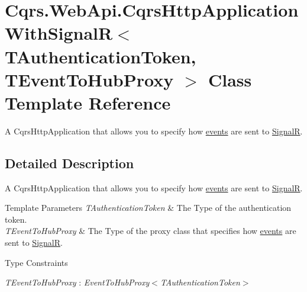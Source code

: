 \hypertarget{classCqrs_1_1WebApi_1_1CqrsHttpApplicationWithSignalR}{}\section{Cqrs.\+Web\+Api.\+Cqrs\+Http\+Application\+With\+SignalR$<$ T\+Authentication\+Token, T\+Event\+To\+Hub\+Proxy $>$ Class Template Reference}
\label{classCqrs_1_1WebApi_1_1CqrsHttpApplicationWithSignalR}


A Cqrs\+Http\+Application that allows you to specify how \hyperlink{}{events} are sent to \hyperlink{namespaceCqrs_1_1WebApi_1_1SignalR}{SignalR}.  




\subsection{Detailed Description}
A Cqrs\+Http\+Application that allows you to specify how \hyperlink{}{events} are sent to \hyperlink{namespaceCqrs_1_1WebApi_1_1SignalR}{SignalR}. 


\begin{DoxyTemplParams}{Template Parameters}
{\em T\+Authentication\+Token} & The Type of the authentication token.\\
\hline
{\em T\+Event\+To\+Hub\+Proxy} & The Type of the proxy class that specifies how \hyperlink{}{events} are sent to \hyperlink{namespaceCqrs_1_1WebApi_1_1SignalR}{SignalR}.\\
\hline
\end{DoxyTemplParams}
\begin{Desc}
\item[Type Constraints]\begin{description}
\item[{\em T\+Event\+To\+Hub\+Proxy} : {\em Event\+To\+Hub\+Proxy$<$T\+Authentication\+Token$>$}]\end{description}
\end{Desc}
